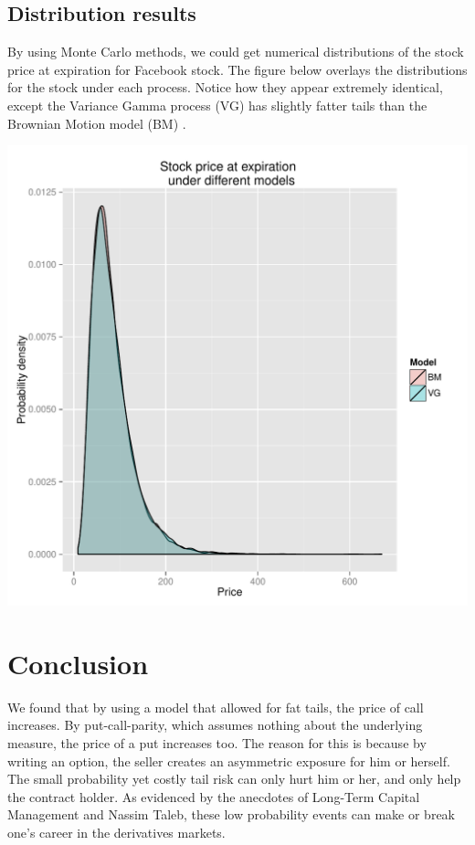 \documentclass[twoside]{article}
\begin{document}
\subsection{Distribution results}
By using Monte Carlo methods, we could get numerical distributions of the stock price at expiration for Facebook stock. The figure below overlays the distributions for the stock under each process. Notice how they appear extremely identical, except the Variance Gamma process (VG) has slightly fatter tails than the Brownian Motion model (BM) \cite{Rlang} \cite{ggplot2}.

\begin{center}
	\includegraphics[width=1.0\textwidth]{fb}
\end{center}

\section{Conclusion}
We found that by using a model that allowed for fat tails, the price of call increases. By put-call-parity, which assumes nothing about the underlying measure, the price of a put increases too. The reason for this is because by writing an option, the seller creates an asymmetric exposure for him or herself. The small probability yet costly tail risk can only hurt him or her, and only help the contract holder. As evidenced by the anecdotes of Long-Term Capital Management and Nassim Taleb, these low probability events can make or break one's career in the derivatives markets.

\newpage



\end{document}
